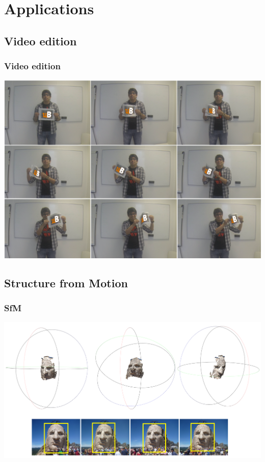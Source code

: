 \documentclass{beamer}
\begin{document}
\section{Applications}

\subsection{Video edition}

\begin{frame}
	\frametitle{Video edition}
\includegraphics[width=1.0\textwidth]{../images/longUB.png}
\end{frame}

\subsection{Structure from Motion}

\begin{frame}
	\frametitle{SfM}
\includegraphics[width=1.0\textwidth]{../images/SFM.png}
\end{frame}
\end{document}

